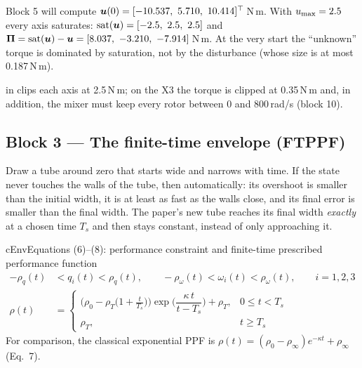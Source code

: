 \begin{toybox}[the torque lost at $t=0$]
Block 5 will compute $\vu(0)=[-10.537,\ 5.710,\ 10.414]^\top$\,N\,m. With $u_{\max}=2.5$ every axis saturates:
$\operatorname{sat}(\bm{u})=[-2.5,\ 2.5,\ 2.5]$ and $\bm\Pi=\sat(\vu)-\vu=[8.037,\ -3.210,\ -7.914]$\,N\,m. At the very start the
``unknown'' torque is dominated by saturation, not by the disturbance (whose size is at most 0.187\,N\,m).
\end{toybox}

\begin{projbox}
 in  clips each axis at 2.5\,N\,m; on the X3 the torque is clipped at
0.35\,N\,m and, in addition, the mixer must keep every rotor between 0 and 800\,rad/s (block 10).
\end{projbox}

\subsection{Block 3 --- The finite-time envelope (FTPPF)}
\label{sec:b3}

\begin{idea}
Draw a tube around zero that starts wide and narrows with time. If the state never touches the walls of the tube,
then automatically: its overshoot is smaller than the initial width, it is at least as fast as the walls close, and
its final error is smaller than the final width. The paper's new tube reaches its final width \emph{exactly} at a chosen
time $T_s$ and then stays constant, instead of only approaching it.
\end{idea}

\begin{eqbox}{cEnv}{Equations (6)--(8): performance constraint and finite-time prescribed performance function}
\begin{align}
-\rho_q(t)&<q_i(t)<\rho_q(t),\qquad -\rho_\omega(t)<\omega_i(t)<\rho_\omega(t),\qquad i=1,2,3 \tag{6, 9}\label{eq:constraint}\\
\rho(t)&=\begin{cases}\Big(\rho_0-\rho_T\big(1+\tfrac{t}{T_s}\big)\Big)\exp\!\Big(\dfrac{\kappa\,t}{t-T_s}\Big)+\rho_T,&0\le t<T_s\\[4pt]
\rho_T,& t\ge T_s\end{cases}\tag{8}\label{eq:ftppf}
\end{align}
For comparison, the classical exponential PPF is $\rho(t)=(\rho_0-\rho_\infty)e^{-\kappa t}+\rho_\infty$ (Eq.~7).
\end{eqbox}

